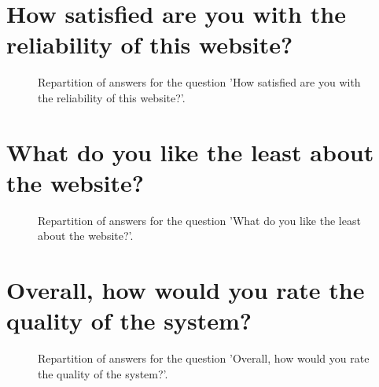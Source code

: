 \documentclass[12pt]{article}
\begin{document}
\clearpage{}
\section{How satisfied are you with the reliability of this website?}

\label{sec:4}


\begin{figure}[h!]
    \caption{\label{figure:q4-1}Repartition of answers for the question 'How satisfied are you with the reliability of this website?'.}
\end{figure}



\clearpage{}
\section{What do you like the least about the website?}

\label{sec:5}


\begin{figure}[h!]
    \caption{\label{figure:q5-1}Repartition of answers for the question 'What do you like the least about the website?'.}
\end{figure}



\clearpage{}
\section{Overall, how would you rate the quality of the system?}

\label{sec:6}


\begin{figure}[h!]
    \caption{\label{figure:q6-1}Repartition of answers for the question 'Overall, how would you rate the quality of the system?'.}
\end{figure}
\end{document}
